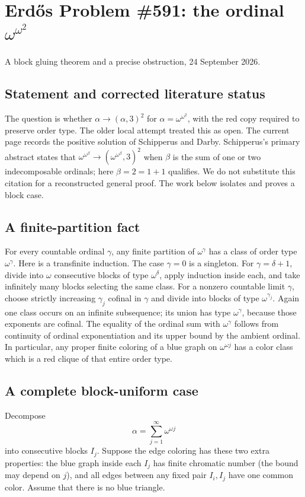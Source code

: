 \section{Erd\H{o}s Problem \#591: the ordinal $\omega^{\omega^2}$}
\noindent A block gluing theorem and a precise obstruction, 24 September 2026.

\subsection*{Statement and corrected literature status}
The question is whether $\alpha\to(\alpha,3)^2$ for $\alpha=\omega^{\omega^2}$, with the red copy required to preserve order type. The older local attempt treated this as open. The current page records the positive solution of Schipperus and Darby. Schipperus's primary abstract states that $\omega^{\omega^\beta}\to(\omega^{\omega^\beta},3)^2$ when $\beta$ is the sum of one or two indecomposable ordinals; here $\beta=2=1+1$ qualifies. We do not substitute this citation for a reconstructed general proof. The work below isolates and proves a block case.

\subsection*{A finite-partition fact}
For every countable ordinal $\gamma$, any finite partition of $\omega^\gamma$ has a class of order type $\omega^\gamma$. Here is a transfinite induction. The case $\gamma=0$ is a singleton. For $\gamma=\delta+1$, divide into $\omega$ consecutive blocks of type $\omega^\delta$, apply induction inside each, and take infinitely many blocks selecting the same class. For a nonzero countable limit $\gamma$, choose strictly increasing $\gamma_j$ cofinal in $\gamma$ and divide into blocks of type $\omega^{\gamma_j}$. Again one class occurs on an infinite subsequence; its union has type $\omega^\gamma$, because those exponents are cofinal. The equality of the ordinal sum with $\omega^\gamma$ follows from continuity of ordinal exponentiation and its upper bound by the ambient ordinal.
In particular, any proper finite coloring of a blue graph on $\omega^{\omega j}$ has a color class which is a red clique of that entire order type.

\subsection*{A complete block-uniform case}
Decompose
\[\alpha=\sum_{j=1}^{\infty}\omega^{\omega j}
\]
into consecutive blocks $I_j$. Suppose the edge coloring has these two extra properties: the blue graph inside each $I_j$ has finite chromatic number (the bound may depend on $j$), and all edges between any fixed pair $I_i,I_j$ have one common color. Assume that there is no blue triangle.

